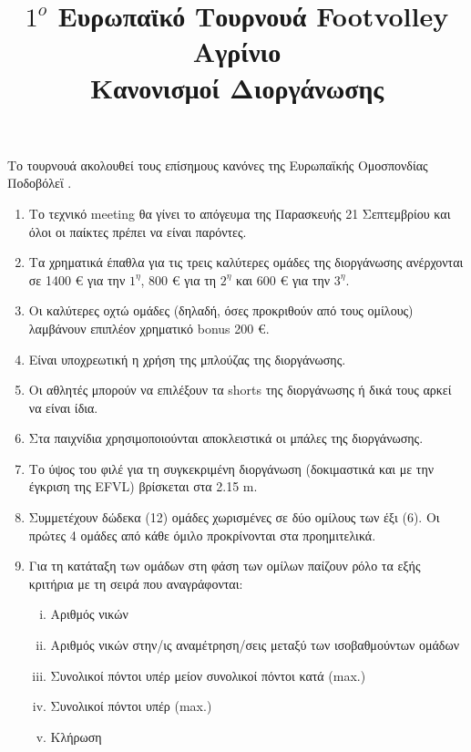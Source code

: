 \documentclass[a4paper,11pt]{article}
\title{$1^{o}$ Ευρωπαϊκό Τουρνουά Footvolley Αγρίνιο\\ Κανονισμοί Διοργάνωσης}
\date{}
\begin{document}
\maketitle
\thispagestyle{fancy}

\vspace{-2cm}

Το τουρνουά ακολουθεί τους επίσημους κανόνες της Ευρωπαϊκής Ομοσπονδίας
Ποδοβόλεϊ \cite{EFVL}.

\begin{enumerate}

\item Το τεχνικό meeting θα γίνει το απόγευμα της Παρασκευής 21 Σεπτεμβρίου και
   όλοι οι παίκτες πρέπει να είναι παρόντες.

\item Τα χρηματικά έπαθλα για τις τρεις καλύτερες ομάδες της διοργάνωσης
  ανέρχονται σε 1400 € για την $1^{\eta}$, 800 € για τη $2^{\eta}$ και 600 € για
  την $3^{\eta}$.

\item Οι καλύτερες οχτώ ομάδες (δηλαδή, όσες προκριθούν από τους ομίλους)
  λαμβάνουν επιπλέον χρηματικό bonus 200 €.

\item Είναι υποχρεωτική η χρήση της μπλούζας της διοργάνωσης.

\item Οι αθλητές μπορούν να επιλέξουν τα shorts της διοργάνωσης ή δικά τους
  αρκεί να είναι ίδια.

\item Στα παιχνίδια χρησιμοποιούνται αποκλειστικά οι μπάλες της διοργάνωσης.

\item Το ύψος του φιλέ για τη συγκεκριμένη διοργάνωση (δοκιμαστικά και με την
  έγκριση της EFVL) βρίσκεται στα 2.15 m.

\item Συμμετέχουν δώδεκα (12) ομάδες χωρισμένες σε δύο ομίλους των έξι (6). Οι
  πρώτες 4 ομάδες από κάθε όμιλο προκρίνονται στα προημιτελικά.

\item Για τη κατάταξη των ομάδων στη φάση των ομίλων παίζουν ρόλο τα εξής
  κριτήρια με τη σειρά που αναγράφονται:

  \begin{enumerate}[i)]
  \item Αριθμός νικών
  \item Αριθμός νικών στην/ις αναμέτρηση/σεις μεταξύ των ισοβαθμούντων ομάδων
  \item Συνολικοί πόντοι υπέρ μείον συνολικοί πόντοι κατά (max.)
  \item Συνολικοί πόντοι υπέρ (max.)
  \item Κλήρωση %
  \end{enumerate}


\end{enumerate}
\end{document}
